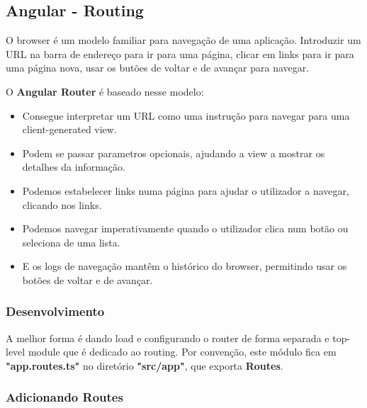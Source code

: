 \documentclass{article}
\begin{document}
\pagebreak

\subsection{Angular - Routing}

O browser é um modelo familiar para navegação de uma aplicação.
Introduzir um URL na barra de endereço para ir para uma página, clicar em links
para ir para uma página nova, usar os butões de voltar e de avançar para navegar.

\vspace{2mm}

O \textbf{Angular Router} é baseado nesse modelo:
\begin{itemize}
  \item Consegue interpretar um URL como uma instrução para navegar para uma client-generated view.
  \item Podem se passar parametros opcionais, ajudando a view a mostrar os detalhes da informação.
  \item Podemos estabelecer links numa página para ajudar o utilizador a navegar, clicando nos links.
  \item Podemos navegar imperativamente quando o utilizador clica num botão ou seleciona de uma lista.
  \item E os logs de navegação mantêm o histórico do browser, permitindo usar os botões de voltar e de avançar.
\end{itemize}

\subsubsection{Desenvolvimento}

A melhor forma é dando load e configurando o router de forma separada e top-level module
que é dedicado ao routing.
Por convenção, este módulo fica em \textbf{"app.routes.ts"} no
diretório \textbf{"src/app"}, que exporta \textbf{Routes}.

\subsubsection{Adicionando Routes}
\end{document}
